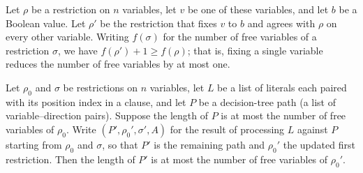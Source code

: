 \begin{lemma}
\label{SwitchingLemma.numFree_update_some_ge}
\leanok
{}
Let $\rho$ be a restriction on $n$ variables, let $v$ be one of these variables, and let
$b$ be a Boolean value. Let $\rho'$ be the restriction that fixes $v$ to $b$ and agrees
with $\rho$ on every other variable. Writing $f(\sigma)$ for the number of free
variables of a restriction $\sigma$, we have $f(\rho') + 1 \ge f(\rho)$; that is, fixing
a single variable reduces the number of free variables by at most one.
\end{lemma}

\begin{lemma}
\label{SwitchingLemma.processClauseLits_remaining_le_numFree}
\leanok
{}
Let $\rho_0$ and $\sigma$ be restrictions on $n$ variables, let $L$ be a list of
literals each paired with its position index in a clause, and let $P$ be a decision-tree
path (a list of variable–direction pairs). Suppose the length of $P$ is at most the
number of free variables of $\rho_0$. Write $(P', \rho_0', \sigma', A)$ for the result
of processing $L$ against $P$ starting from $\rho_0$ and $\sigma$, so that $P'$ is the
remaining path and $\rho_0'$ the updated first restriction. Then the length of $P'$ is
at most the number of free variables of $\rho_0'$.
\end{lemma}

